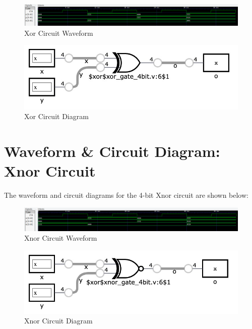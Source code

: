 \documentclass[runningheads, 12pt]{report}
\begin{document}
\begin{figure}[h]
	\centering
	\includegraphics[scale=0.65]{gtk_xor_4bit}
	\caption{Xor Circuit Waveform}
	\label{fig: gtk_xor_4bit}
\end{figure}
	
\begin{figure}[h]
	\centering
	\includegraphics[width=1.0\textwidth]{xor_4bit}
	\caption{Xor Circuit Diagram}
	\label{fig: xor_4bit}
\end{figure}
\pagebreak

	\section{Waveform \& Circuit Diagram: Xnor Circuit}
	
	The waveform and circuit diagrams for the 4-bit Xnor circuit are shown below:
\begin{figure}[h]
	\centering
	\includegraphics[scale=0.65]{gtk_xnor_4bit}
	\caption{Xnor Circuit Waveform}
	\label{fig: gtk_xnor_4bit}
\end{figure}
	
\begin{figure}[h]
	\centering
	\includegraphics[width=1.0\textwidth]{xnor_4bit}
	\caption{Xnor Circuit Diagram}
	\label{fig: xnor_4bit}
\end{figure}
\pagebreak
\end{document}
